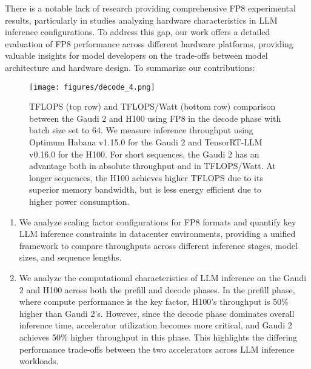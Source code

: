 There is a notable lack of research providing comprehensive FP8 experimental results, particularly in studies analyzing hardware characteristics in LLM inference configurations. To address this gap, our work offers a detailed evaluation of FP8 performance across different hardware platforms, providing valuable insights for model developers on the trade-offs between model architecture and hardware design.
To summarize our contributions:

\begin{figure*}[ht]
    \centering
    \texttt{[image: figures/decode\_4.png]}
    \vspace{-1.6em}
    \caption{TFLOPS (top row) and TFLOPS/Watt (bottom row) comparison between the Gaudi 2 and H100 using FP8 in the decode phase with batch size set to 64. We measure inference throughput using Optimum Habana v1.15.0 for the Gaudi 2 and TensorRT-LLM v0.16.0 for the H100. For short sequences, the Gaudi 2 has an advantage both in absolute throughput and in TFLOPS/Watt. At longer sequences, the H100 achieves higher TFLOPS due to its superior memory bandwidth, but is less energy efficient due to higher power consumption.}
    \label{fig:decode_efficiency}
    \vskip -0.1in
\end{figure*}

\begin{enumerate}
    \itemsep0em
    \item 
    We analyze scaling factor configurations for FP8 formats and quantify key LLM inference constraints in datacenter environments, providing a unified framework to compare throughputs across different inference stages, model sizes, and sequence lengths.
    \item 
    We analyze the computational characteristics of LLM inference on the Gaudi 2 and H100 across both the prefill and decode phases. In the prefill phase, where compute performance is the key factor, H100's throughput is 50\% higher than Gaudi 2's. However, since the decode phase dominates overall inference time, accelerator utilization becomes more critical, and Gaudi 2 achieves 50\% higher throughput in this phase. This highlights the differing performance trade-offs between the two accelerators across LLM inference workloads.
\end{enumerate}
